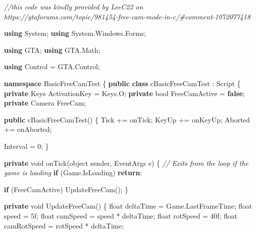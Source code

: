 \documentclass[
  openany]{book}
\newenvironment{Shaded}{\begin{snugshade}}{\end{snugshade}}
\newcommand{\CommentTok}[1]{\textcolor[rgb]{0.56,0.35,0.01}{\textit{#1}}}
\newcommand{\DataTypeTok}[1]{\textcolor[rgb]{0.13,0.29,0.53}{#1}}
\newcommand{\DecValTok}[1]{\textcolor[rgb]{0.00,0.00,0.81}{#1}}
\newcommand{\FunctionTok}[1]{\textcolor[rgb]{0.00,0.00,0.00}{#1}}
\newcommand{\KeywordTok}[1]{\textcolor[rgb]{0.13,0.29,0.53}{\textbf{#1}}}
\newcommand{\NormalTok}[1]{#1}
\begin{document}
\begin{Shaded}
\begin{Highlighting}[]
\CommentTok{//this code was kindly provided by LeeC22 on https://gtaforums.com/topic/981454-free-cam-mode-in-c/#comment-1072077418}

\KeywordTok{using}\NormalTok{ System;}
\KeywordTok{using}\NormalTok{ System.}\FunctionTok{Windows}\NormalTok{.}\FunctionTok{Forms}\NormalTok{;}

\KeywordTok{using}\NormalTok{ GTA;}
\KeywordTok{using}\NormalTok{ GTA.}\FunctionTok{Math}\NormalTok{;}

\KeywordTok{using}\NormalTok{ Control = GTA.}\FunctionTok{Control}\NormalTok{;}

\KeywordTok{namespace}\NormalTok{ BasicFreeCamTest}
\NormalTok{\{}
    \KeywordTok{public} \KeywordTok{class}\NormalTok{ cBasicFreeCamTest : Script}
\NormalTok{    \{}
        \KeywordTok{private}\NormalTok{ Keys ActivationKey = Keys.}\FunctionTok{O}\NormalTok{;}
        \KeywordTok{private} \DataTypeTok{bool}\NormalTok{ FreeCamActive = }\KeywordTok{false}\NormalTok{;}
        \KeywordTok{private}\NormalTok{ Camera FreeCam;}

        \KeywordTok{public} \FunctionTok{cBasicFreeCamTest}\NormalTok{()}
\NormalTok{        \{}
\NormalTok{            Tick += onTick;}
\NormalTok{            KeyUp += onKeyUp;}
\NormalTok{            Aborted += onAborted;}

\NormalTok{            Interval = }\DecValTok{0}\NormalTok{;}
\NormalTok{        \}}

        \KeywordTok{private} \DataTypeTok{void} \FunctionTok{onTick}\NormalTok{(}\DataTypeTok{object}\NormalTok{ sender, EventArgs e)}
\NormalTok{        \{}
            \CommentTok{// Exits from the loop if the game is loading}
            \KeywordTok{if}\NormalTok{ (Game.}\FunctionTok{IsLoading}\NormalTok{) }\KeywordTok{return}\NormalTok{;}

            \KeywordTok{if}\NormalTok{ (FreeCamActive) }\FunctionTok{UpdateFreeCam}\NormalTok{();}
\NormalTok{        \}}

        \KeywordTok{private} \DataTypeTok{void} \FunctionTok{UpdateFreeCam}\NormalTok{()}
\NormalTok{        \{}
            \DataTypeTok{float}\NormalTok{ deltaTime = Game.}\FunctionTok{LastFrameTime}\NormalTok{;}
            \DataTypeTok{float}\NormalTok{ speed = 5f;}
            \DataTypeTok{float}\NormalTok{ camSpeed = speed * deltaTime;}
            \DataTypeTok{float}\NormalTok{ rotSpeed = 40f;}
            \DataTypeTok{float}\NormalTok{ camRotSpeed = rotSpeed * deltaTime;}


\end{Highlighting}
\end{Shaded}
\end{document}
